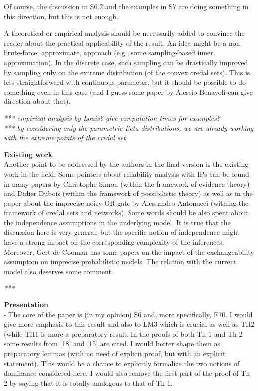 \documentclass[12pt, a4paper]{elsarticle}
\begin{document}
Of course, the discussion in S6.2 and the examples in S7 are doing something in this direction, but this is not enough.

A theoretical or empirical analysis should be necessarily added to convince the reader about the practical applicability of the result.
An idea might be a non-brute-force, approximate, approach (e.g., some sampling-based inner approximation). In the discrete case, such sampling can be drastically improved by sampling only on the extreme distribution (of the convex credal sets). This is less straightforward with continuous parameter, but it should be possible to do something even in this case (and I guess some paper by Alessio Benavoli can give direction about that).

\medskip
\emph{*** empirical analysis by Louis? give computation times for examples?\\
*** by considering only the parametric Beta distributions, we are already working with the extreme points of the credal set}
%
\medskip

\textbf{Existing work}\\
Another point to be addressed by the authors in the final version is the existing work in the field. Some pointers about reliability analysis with IPs can be found in many papers by Christophe Simon (within the framework of evidence theory) and Didier Dubois (within the framework of possibilistic theory) as well as in the paper about the imprecise noisy-OR gate by Alessandro Antonucci (withing the framework of credal sets and networks). Some words should be also spent about the independence assumptions in the underlying model. It is true that the discussion here is very general, but the specific notion of independence might have a strong impact on the corresponding complexity of the inferences. Moreover, Gert de Cooman has some papers on the impact of the exchangeability assumption on imprecise probabilistic models. The relation with the current model also deserves some comment.

\medskip
\emph{***}
\medskip

\textbf{Presentation}\\
- The core of the paper is (in my opinion) S6 and, more specifically, E10. I would give more emphasis to this result and also to LM3 which is crucial as well as TH2 (while TH1 is more a preparatory result. In the proofs of both Th 1 and Th 2 some results from [18] and [15] are cited. I would better shape them as preparatory lemmas (with no need of explicit proof, but with an explicit statement). This would be a chance to explicitly formalize the two notions of dominance considered here. I would also remove the first part of the proof of Th 2 by saying that it is totally analogous to that of Th 1.
\end{document}
